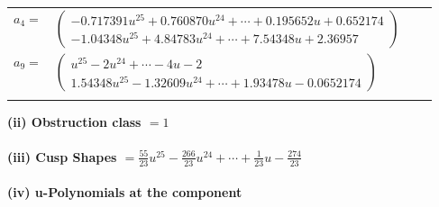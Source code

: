 \documentclass[1p]{elsarticle_modified}
\theoremstyle{definition}
\begin{document}
\begin{tabular}{m{7pt} m{180pt} m{7pt} m{180pt} }
\flushright $a_{4}=$&$\begin{pmatrix}-0.717391 u^{25}+0.760870 u^{24}+\cdots+0.195652 u+0.652174\\-1.04348 u^{25}+4.84783 u^{24}+\cdots+7.54348 u+2.36957\end{pmatrix}$ \\
\flushright $a_{9}=$&$\begin{pmatrix}u^{25}-2 u^{24}+\cdots-4 u-2\\1.54348 u^{25}-1.32609 u^{24}+\cdots+1.93478 u-0.0652174\end{pmatrix}$\\&\end{tabular}
\flushleft \textbf{(ii) Obstruction class $= 1$}\\~\\
\flushleft \textbf{(iii) Cusp Shapes $= \frac{55}{23} u^{25}-\frac{266}{23} u^{24}+\cdots+\frac{1}{23} u-\frac{274}{23}$}\\~\\
\newpage\renewcommand{\arraystretch}{1}
\flushleft \textbf{(iv) u-Polynomials at the component}\newline \\
\end{document}
